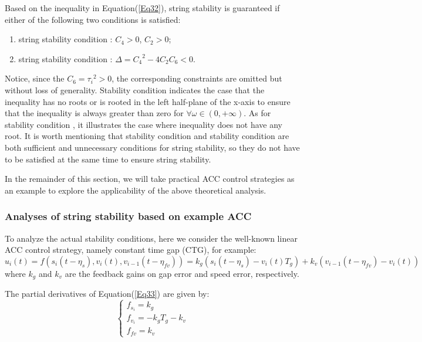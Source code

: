 \documentclass[a4paper]{cas-sc}
\begin{document}
Based on the inequality in Equation(\ref{Eq32}), string stability is guaranteed if either of the following two conditions is satisfied:
\begin{enumerate}
  \item string stability condition \uppercase\expandafter{}: $C_4>0$, $C_2>0$;
  \item string stability condition \uppercase\expandafter{}: $\Delta={C_4}^2-4C_2C_6<0$.
\end{enumerate}

Notice, since the $C_6={\tau_i}^2>0$, the corresponding constraints are omitted but without loss of generality. Stability condition \uppercase\expandafter{} indicates the case that the inequality has no roots or is rooted in the left half-plane of the x-axis to ensure that the inequality is always greater than zero for $\forall\omega\in(0,+\infty)$. As for stability condition \uppercase\expandafter{}, it illustrates the case where inequality does not have any root. It is worth mentioning that stability condition \uppercase\expandafter{} and stability condition \uppercase\expandafter{} are both sufficient and unnecessary conditions for string stability, so they do not have to be satisfied at the same time to ensure string stability.

In the remainder of this section, we will take practical ACC control strategies as an example to explore the applicability of the above theoretical analysis.


\subsubsection{Analyses of string stability based on example ACC}
\label{Section 4.3.3}

To analyze the actual stability conditions, here we consider the well-known linear ACC control strategy, namely constant time gap (CTG), for example:
\begin{equation}
  u_i\left(t\right)=f\left(s_i\left(t-\eta_s\right),v_i\left(t\right),v_{i-1}\left(t-\eta_{fv}\right)\right)=k_g\left(s_i\left(t-\eta_s\right)-v_i\left(t\right)T_g\right)+k_v\left(v_{i-1}\left(t-\eta_{fv}\right)-v_i\left(t\right)\right)
  \label{Eq33}
\end{equation}
where $k_g$ and $k_v$ are the feedback gains on gap error and speed error, respectively.

The partial derivatives of Equation(\ref{Eq33}) are given by:
\begin{equation}
  \left\{\begin{array}{l}
    f_{s_{i}}=k_{g}              \\
    f_{v_{i}}=-k_{g} T_{g}-k_{v} \\
    f_{f v}=k_{v}
  \end{array}\right.
  \label{Eq34}
\end{equation}
\end{document}
